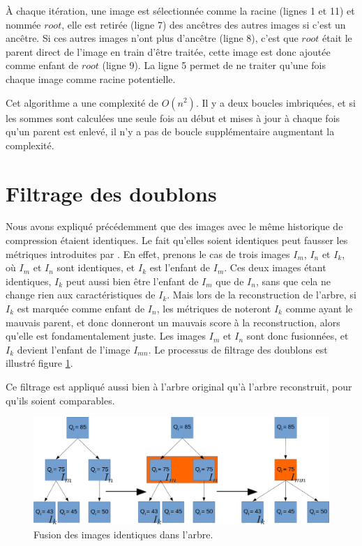 \documentclass[utf8,final]{stageM2R} %
\begin{document}
À chaque itération, une image est sélectionnée comme la racine (lignes 1 et 11) et nommée $root$, elle est retirée (ligne 7) des ancêtres des autres images si c'est un ancêtre. Si ces autres images n'ont plus d'ancêtre (ligne 8), c'est que $root$ était le parent direct de l'image en train d'être traitée, cette image est donc ajoutée comme enfant de $root$ (ligne 9). La ligne 5 permet de ne traiter qu'une fois chaque image comme racine potentielle.

Cet algorithme a une complexité de $O(n^{2})$. Il y a deux boucles imbriquées, et si les sommes sont calculées une seule fois au début et mises à jour à chaque fois qu'un parent est enlevé, il n'y a pas de boucle supplémentaire augmentant la complexité.

\section{Filtrage des doublons}
\label{sec:filtrage}
Nous avons expliqué précédemment que des images avec le même historique de compression étaient identiques. Le fait qu'elles soient identiques peut fausser les métriques introduites par . En effet, prenons le cas de trois images $I_m$, $I_n$ et $I_k$, où $I_m$ et $I_n$ sont identiques, et $I_k$ est l'enfant de $I_m$. Ces deux images étant identiques, $I_k$ peut aussi bien être l'enfant de $I_m$ que de $I_n$, sans que cela ne change rien aux caractéristiques de $I_k$. Mais lors de la reconstruction de l'arbre, si $I_k$ est marquée comme enfant de $I_n$, les métriques de  noteront $I_k$ comme ayant le mauvais parent, et donc donneront un mauvais score à la reconstruction, alors qu'elle est fondamentalement juste. Les images $I_m$ et $I_n$ sont donc fusionnées, et $I_k$ devient l'enfant de l'image $I_{mn}$. Le processus de filtrage des doublons est illustré figure \ref{fig:identique}. 

Ce filtrage est appliqué aussi bien à l'arbre original qu'à l'arbre reconstruit, pour qu'ils soient comparables.


\begin{figure}[H]
\centering
\includegraphics[width=0.9\linewidth]{images/fusion_1}
\caption{Fusion des images identiques dans l'arbre.}
\label{fig:identique}
\end{figure}
\end{document}
